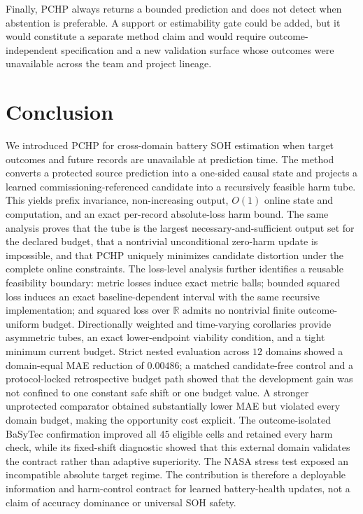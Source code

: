 \documentclass[11pt]{article}
\newcommand{\R}{\mathbb{R}}
\begin{document}
Finally, PCHP always returns a bounded prediction and does not detect when abstention is preferable. A support or estimability gate could be added, but it would constitute a separate method claim and would require outcome-independent specification and a new validation surface whose outcomes were unavailable across the team and project lineage.

\section{Conclusion}

We introduced PCHP for cross-domain battery SOH estimation when target outcomes and future records are unavailable at prediction time. The method converts a protected source prediction into a one-sided causal state and projects a learned commissioning-referenced candidate into a recursively feasible harm tube. This yields prefix invariance, non-increasing output, $O(1)$ online state and computation, and an exact per-record absolute-loss harm bound. The same analysis proves that the tube is the largest necessary-and-sufficient output set for the declared budget, that a nontrivial unconditional zero-harm update is impossible, and that PCHP uniquely minimizes candidate distortion under the complete online constraints. The loss-level analysis further identifies a reusable feasibility boundary: metric losses induce exact metric balls; bounded squared loss induces an exact baseline-dependent interval with the same recursive implementation; and squared loss over $\R$ admits no nontrivial finite outcome-uniform budget. Directionally weighted and time-varying corollaries provide asymmetric tubes, an exact lower-endpoint viability condition, and a tight minimum current budget. Strict nested evaluation across $12$ domains showed a domain-equal MAE reduction of $0.00486$; a matched candidate-free control and a protocol-locked retrospective budget path showed that the development gain was not confined to one constant safe shift or one budget value. A stronger unprotected comparator obtained substantially lower MAE but violated every domain budget, making the opportunity cost explicit. The outcome-isolated BaSyTec confirmation improved all $45$ eligible cells and retained every harm check, while its fixed-shift diagnostic showed that this external domain validates the contract rather than adaptive superiority. The NASA stress test exposed an incompatible absolute target regime. The contribution is therefore a deployable information and harm-control contract for learned battery-health updates, not a claim of accuracy dominance or universal SOH safety.
\end{document}
